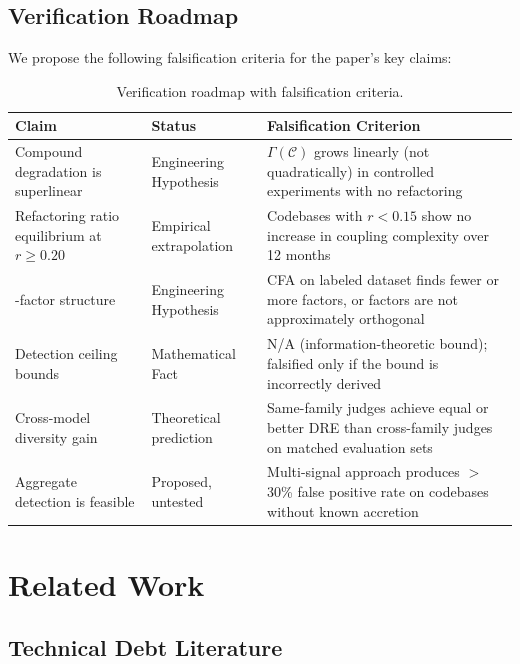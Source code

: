 \documentclass[11pt, a4paper, logo, copyright]{googledeepmind}
\begin{document}
\subsection{Verification Roadmap}

We propose the following falsification criteria for the paper's key claims:

\begin{table}[htbp]
\centering
\caption{Verification roadmap with falsification criteria.}
\label{tab:verification}
\small
\begin{tabular}{@{}p{3.5cm} p{3.5cm} p{5cm}@{}}
\toprule
\textbf{Claim} & \textbf{Status} & \textbf{Falsification Criterion} \\
\midrule
Compound degradation is superlinear & Engineering Hypothesis & $\Gamma(\mathcal{C})$ grows linearly (not quadratically) in controlled experiments with no refactoring \\
\addlinespace
Refactoring ratio equilibrium at $r \geq 0.20$ & Empirical extrapolation & Codebases with $r < 0.15$ show no increase in coupling complexity over 12 months \\
\addlinespace
3-factor structure & Engineering Hypothesis & CFA on labeled dataset finds fewer or more factors, or factors are not approximately orthogonal \\
\addlinespace
Detection ceiling bounds & Mathematical Fact & N/A (information-theoretic bound); falsified only if the bound is incorrectly derived \\
\addlinespace
Cross-model diversity gain & Theoretical prediction & Same-family judges achieve equal or better DRE than cross-family judges on matched evaluation sets \\
\addlinespace
Aggregate detection is feasible & Proposed, untested & Multi-signal approach produces $>$ 30\% false positive rate on codebases without known accretion \\
\bottomrule
\end{tabular}
\end{table}


\section{Related Work}
\label{sec:related}

\subsection{Technical Debt Literature}
\end{document}
